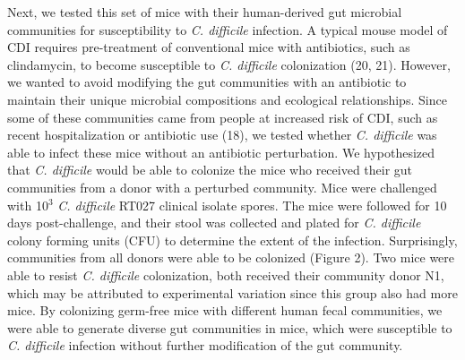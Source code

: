 \documentclass[
  12pt,
]{article}
\begin{document}
Next, we tested this set of mice with their human-derived gut microbial
communities for susceptibility to \emph{C. difficile} infection. A
typical mouse model of CDI requires pre-treatment of conventional mice
with antibiotics, such as clindamycin, to become susceptible to \emph{C.
difficile} colonization (20, 21). However, we wanted to avoid modifying
the gut communities with an antibiotic to maintain their unique
microbial compositions and ecological relationships. Since some of these
communities came from people at increased risk of CDI, such as recent
hospitalization or antibiotic use (18), we tested whether \emph{C.
difficile} was able to infect these mice without an antibiotic
perturbation. We hypothesized that \emph{C. difficile} would be able to
colonize the mice who received their gut communities from a donor with a
perturbed community. Mice were challenged with 10\(^{3}\) \emph{C.
difficile} RT027 clinical isolate spores. The mice were followed for 10
days post-challenge, and their stool was collected and plated for
\emph{C. difficile} colony forming units (CFU) to determine the extent
of the infection. Surprisingly, communities from all donors were able to
be colonized (Figure 2). Two mice were able to resist \emph{C.
difficile} colonization, both received their community donor N1, which
may be attributed to experimental variation since this group also had
more mice. By colonizing germ-free mice with different human fecal
communities, we were able to generate diverse gut communities in mice,
which were susceptible to \emph{C. difficile} infection without further
modification of the gut community.
\end{document}
